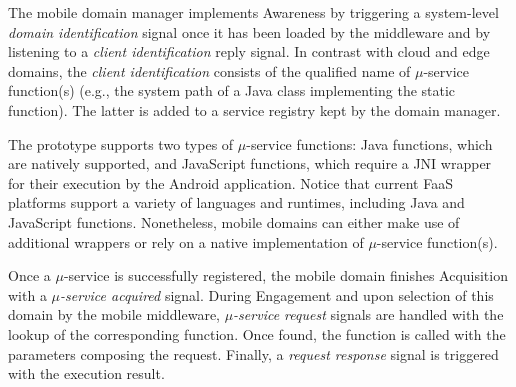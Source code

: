 The mobile domain manager implements Awareness by triggering a system-level \textit{domain identification} signal once it has been loaded by the middleware and by listening to a \textit{client identification} reply signal. In contrast with cloud and edge domains, the \textit{client identification} consists of the qualified name of $\mu$-service function(s) (e.g., the system path of a Java class implementing the static function). The latter is added to a service registry kept by the domain manager.

The prototype supports two types of $\mu$-service functions: Java functions, which are natively supported, and JavaScript functions, which require a JNI wrapper for their execution by the Android application. Notice that current FaaS platforms support a variety of languages and runtimes, including Java and JavaScript functions. Nonetheless, mobile domains can either make use of additional wrappers or rely on a native implementation of $\mu$-service function(s).  

Once a $\mu$-service is successfully registered, the mobile domain finishes Acquisition with a \textit{$\mu$-service acquired} signal. During Engagement and upon selection of this domain by the mobile middleware, \textit{$\mu$-service request} signals are handled with the lookup of the corresponding function. Once found, the function is called with the parameters composing the request. Finally, a \textit{request response} signal is triggered with the execution result.



